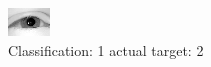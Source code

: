 \begin{figure}[h!]
\begin{center}
\includegraphics[width=0.60\columnwidth]{figures/ID2329_class_1_target_2.png}
\end{center}
\caption{ Classification: 1 actual target: 2}
\label{fig:ID2329_class_1_target_2}
\end{figure}
